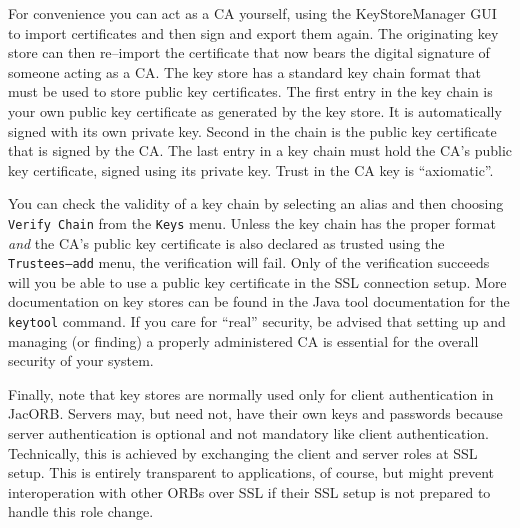 \documentclass[12pt]{scrbook}
\begin{document}
\bigskip
\centerline{}

For   convenience  you   can  act   as  a   CA  yourself,   using  the
KeyStoreManager GUI  to import certificates  and then sign  and export
them  again.   The  originating  key  store can  then  re--import  the
certificate that now bears the  digital signature of someone acting as
a CA. The key store has a  standard key chain format that must be used
to store public key certificates. The  first entry in the key chain is
your own public  key certificate as generated by the  key store. It is
automatically signed with its own  private key. Second in the chain is
the public key certificate that is signed by the CA. The last entry in
a key  chain must hold the  CA's public key  certificate, signed using
its private key. Trust in the CA key is ``axiomatic''. 

\bigskip
\centerline{}

You can  check the validity of a  key chain by selecting  an alias and
then choosing {\tt Verify Chain}  from the {\tt Keys} menu. Unless the
key  chain  has  the proper  format  {\em  and}  the CA's  public  key
certificate is also declared  as trusted using the {\tt Trustees--add}
menu, the  verification will fail.  Only of  the verification succeeds
will you be able to use a public key certificate in the SSL connection
setup. More documentation on key stores  can be found in the Java tool
documentation for the {\tt keytool}  command. If you care for ``real''
security,  be advised  that setting  up  and managing  (or finding)  a
properly administered CA is essential for the overall security of your
system.

Finally,  note that  key  stores  are normally  used  only for  client
authentication in JacORB.   Servers may, but need not,  have their own
keys and  passwords because server authentication is  optional and not
mandatory like  client authentication. Technically,  this is achieved
by  exchanging the  client  and server  roles  at SSL  setup. This  is
entirely  transparent to  applications, of  course, but  might prevent
interoperation  with other ORBs  over SSL  if their  SSL setup  is not
prepared to handle this role change.
\end{document}
